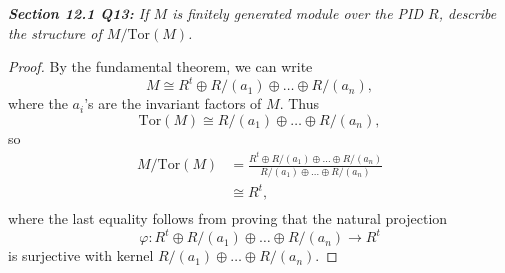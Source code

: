 \documentclass{article}
\begin{document}
\it \textbf{Section 12.1 Q13:} If $M$ is finitely generated module over the
  PID $R$, describe the structure of $M/\text{Tor}(M)$.
  \begin{proof}
    By the fundamental theorem, we can write
    \[M\cong R^t \oplus R/(a_1)\oplus\ldots \oplus R/(a_n),\]
    where the $a_i$'s are the invariant factors of $M$. Thus
    \[\text{Tor}(M) \cong R/(a_1)\oplus\ldots \oplus R/(a_n),\]
    so
    \begin{align*}
      M/\text{Tor}(M) &=\frac{R^t \oplus R/(a_1)\oplus\ldots \oplus R/(a_n)}
        {R/(a_1)\oplus\ldots \oplus R/(a_n)}\\
      &\cong R^t,\\
    \end{align*}
    where the last equality follows from proving that the natural
    projection \[\varphi:R^t \oplus R/(a_1)\oplus\ldots \oplus R/(a_n)
    \rightarrow R^t\] is surjective with kernel $R/(a_1)\oplus\ldots \oplus
    R/(a_n)$.
  \end{proof}
\end{document}
